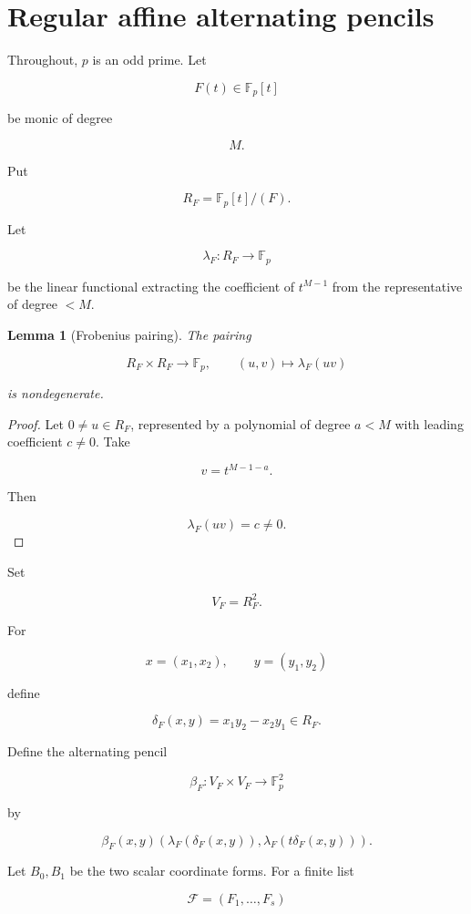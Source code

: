 \documentclass[11pt]{article}
\newtheorem{lemma}[theorem]{Lemma}
\begin{document}
\section{Regular affine alternating pencils}

Throughout, $p$ is an odd prime. Let

\[
F(t)\in\mathbb F_p[t]
\]

be monic of degree

\[
M.
\]

Put

\[
R_F=\mathbb F_p[t]/(F).
\]

Let

\[
\lambda_F:R_F\to\mathbb F_p
\]

be the linear functional extracting the coefficient of $t^{M-1}$ from the representative of degree $<M$.

\begin{lemma}[Frobenius pairing]
The pairing

\[
R_F\times R_F\to\mathbb F_p,
\qquad
(u,v)\mapsto \lambda_F(uv)
\]

is nondegenerate.

\end{lemma}

\begin{proof}
Let $0\ne u\in R_F$, represented by a polynomial of degree $a<M$ with leading coefficient $c\ne0$. Take

\[
v=t^{M-1-a}.
\]

Then

\[
\lambda_F(uv)=c\ne0.
\]

\end{proof}

Set

\[
V_F=R_F^2.
\]

For

\[
x=(x_1,x_2),\qquad y=(y_1,y_2)
\]

define

\[
\delta_F(x,y)=x_1y_2-x_2y_1\in R_F.
\]

Define the alternating pencil

\[
\beta_F:V_F\times V_F\to \mathbb F_p^2
\]

by

\[
\beta_F(x,y)
\left(
\lambda_F(\delta_F(x,y)),
\lambda_F(t\delta_F(x,y))
\right).
\tag{3.1}
\]

Let $B_0,B_1$ be the two scalar coordinate forms. For a finite list

\[
\mathcal F=(F_1,\ldots,F_s)
\]
\end{document}
